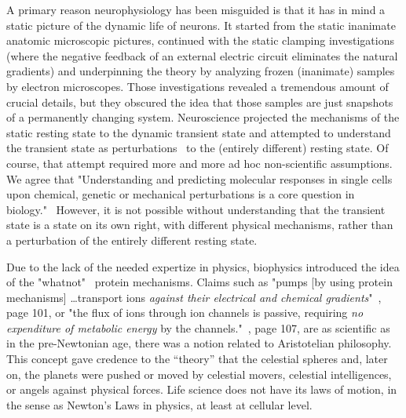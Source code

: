 \ifx\magyar\undefined
A primary reason neurophysiology has been misguided is that it has in mind a static picture of the dynamic life of neurons.
It started from the static
inanimate anatomic microscopic pictures, continued
with the static clamping investigations (where
the negative feedback of an external electric circuit eliminates the natural gradients) and underpinning the
theory by analyzing frozen (inanimate) samples
by electron microscopes.
Those investigations revealed a tremendous amount of crucial details,
but they obscured the idea
that those samples are just snapshots of a permanently
changing system.
Neuroscience projected the mechanisms of the static resting state to the dynamic transient state and attempted
to understand the transient state 
as perturbations~\cite{PerturbationNeuralComputation:2002} to the  (entirely different) resting state.
Of course, that attempt required more and more ad hoc non-scientific assumptions.
We agree that "Understanding and predicting molecular responses
in single cells upon chemical, genetic or mechanical perturbations is a core question in biology."~\cite{PerturbationSingleCell:2023}
However, it is not possible without understanding that the transient state is a state on its own right,
with different physical mechanisms, rather than a perturbation of the entirely different resting state.

Due to the lack of the needed expertize in physics,
biophysics introduced the idea of the "whatnot"~\cite{Schrodinger:1992} protein mechanisms.
Claims such as "pumps [by using protein mechanisms] \dots transport ions \textit{against their
electrical and chemical gradients}"~\cite{PrinciplesNeuralScience:2013}, page 101, 
or "the flux of ions through ion channels is passive,
requiring \textit{no expenditure of metabolic energy} by the
channels."~\cite{PrinciplesNeuralScience:2013}, page 107, are as scientific as in the pre-Newtonian age,
there was a notion related to Aristotelian philosophy. This concept gave credence to the “theory” that the celestial spheres and, later on, the planets were pushed or moved by celestial movers, celestial intelligences, or angels against physical forces. Life science does not have its laws of motion, in the sense as Newton's Laws in physics, at least at cellular level. 


